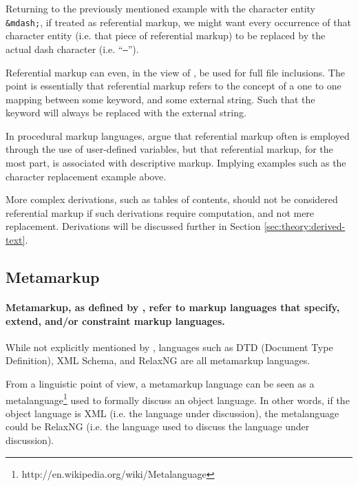 \documentclass{scrreprt}
\begin{document}
Returning to the previously mentioned example with the character entity \texttt{\&mdash;}, if treated as referential markup, we might want every occurrence of that character entity (i.e. that piece of referential markup) to be replaced by the actual dash character (i.e. ``\texttt{--}'').

Referential markup can even, in the view of \citet{coombs}, be used for full file inclusions. The point is essentially that referential markup refers to the concept of a one to one mapping between some keyword, and some external string. Such that the keyword will always be replaced with the external string.

In procedural markup languages, \citet{coombs} argue that referential markup often is employed through the use of user-defined variables, but that referential markup, for the most part, is associated with descriptive markup. Implying examples such as the character replacement example above.

More complex derivations, such as tables of contents, should not be considered referential markup if such derivations require computation, and not mere replacement. Derivations will be discussed further in Section \ref{sec:theory:derived-text}.





\subsection{Metamarkup}
\paragraph{Metamarkup, as defined by \citet{coombs}, refer to markup languages that specify, extend, and/or constraint markup languages.} While not explicitly mentioned by \citet{coombs}, languages such as DTD (Document Type Definition), XML Schema, and RelaxNG are all metamarkup languages.


From a linguistic point of view, a metamarkup language can be seen as a metalanguage\footnote{http://en.wikipedia.org/wiki/Metalanguage} used to formally discuss an object language. In other words, if the object language is XML (i.e. the language under discussion), the metalanguage could be RelaxNG (i.e. the language used to discuss the language under discussion).
\end{document}
